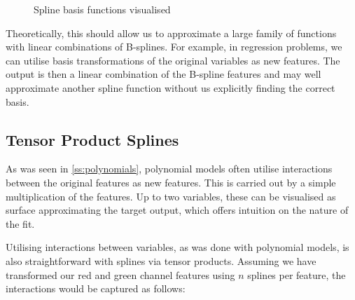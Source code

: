 \begin{figure}
    \centering
    \caption{Spline basis functions visualised}
    \label{fig:spline}
\end{figure}

Theoretically, this should allow us to approximate a large family of functions with linear combinations of B-splines. For example, in regression problems, we can utilise basis transformations of the original variables as new features. The output is then a linear combination of the B-spline features and may well approximate another spline function without us explicitly finding the correct basis.

\subsection{Tensor Product Splines}

As was seen in \ref{ss:polynomials}, polynomial models often utilise interactions between the original features as new features. This is carried out by a simple multiplication of the features. Up to two variables, these can be visualised as surface approximating the target output, which offers intuition on the nature of the fit.

Utilising interactions between variables, as was done with polynomial models, is also straightforward with splines via tensor products. Assuming we have transformed our red and green channel features using $n$ splines per feature, the interactions would be captured as follows:

